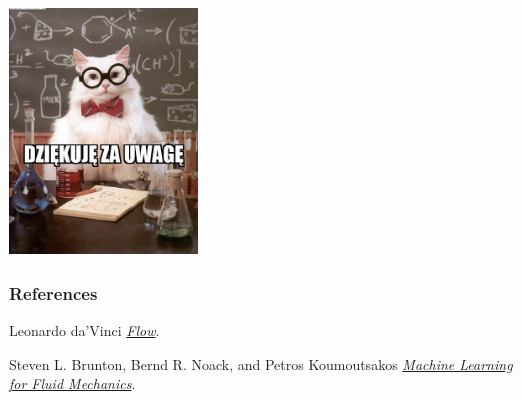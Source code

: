 \documentclass[aspectratio=169]{beamer}
\begin{document}
	
	
	\begin{frame}
		\begin{center}
			\includegraphics[width=5cm]{imgs/dziekuje.jpg}
		\end{center}
	\end{frame}
	
	\begin{frame}[allowframebreaks]
		\frametitle{References}
\begin{thebibliography}{9}
	
	Leonardo da'Vinci  \textit{\href{https://images.slideplayer.com/26/8393980/slides/slide_5.jpg}{Flow}}.
	
	Steven L. Brunton, Bernd R. Noack, and Petros Koumoutsakos
	\textit{\href{https://www.annualreviews.org/doi/abs/10.1146/annurev-fluid-010719-060214}{Machine Learning for Fluid Mechanics}}. 
	
%	
\end{thebibliography}
	\end{frame}
	


	
\end{document}
